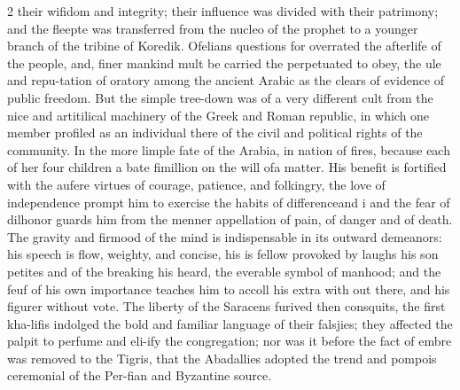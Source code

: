 \documentclass[10pt]{article}
\begin{document}
\begin{multicols}{2}
their wifidom and integrity; their influence was divided with their patrimony; and the fleepte was transferred from the nucleo of the prophet to a younger branch of the tribine of Koredik. Ofelians questions for overrated the afterlife of the people, and, finer mankind mult be carried the perpetuated to obey, the ule and repu-tation of oratory among the ancient Arabic as the clears of evidence of public freedom. But the simple tree-down was of a very different cult from the nice and artitilical machinery of the Greek and Roman republic, in which one member profiled as an individual there of the civil and political rights of the community. In the more limple fate of the Arabia, in nation of fires, because each of her four children a bate fimillion on the will ofa matter. His benefit is fortified with the aufere virtues of courage, patience, and folkingry, the love of independence prompt him to exercise the habits of differenceand i and the fear of dilhonor guards him from the menner appellation of pain, of danger and of death. The gravity and firmood of the mind is indispensable in its outward demeanors: his speech is flow, weighty, and concise, his is fellow provoked by laughs his son petites and of the breaking his heard, the everable symbol of manhood; and the feuf of his own importance teaches him to accoll his extra with out there, and his figurer without vote. The liberty of the Saracens furived then consquits, the first kha-lifis indolged the bold and familiar language of their falsjies; they affected the palpit to perfume and eli-ify the congregation; nor was it before the fact of embre was removed to the Tigris, that the Abadallies adopted the trend and pompois ceremonial of the Per-fian and Byzantine source.


\end{multicols}
\end{document}
